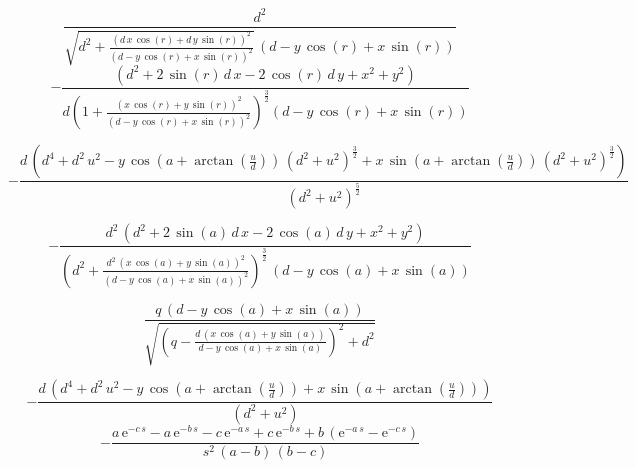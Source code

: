 \documentclass[]{article}
\begin{document}
\begin{equation}
\frac{d^2}{\sqrt{d^2 + \frac{{\left(d\, x\, \cos\!\left(r\right) + d\, y\, 
\sin\!\left(r\right)\right)}^2}{{\left(d - y\, \cos\!\left(r\right) + x\, 
\sin\!\left(r\right)\right)}^2}}\, \left(d - y\, \cos\!\left(r\right) + x\, 
\sin\!\left(r\right)\right)}
  \label{}
\end{equation}
\begin{equation}
-\frac{ \left(d^2 + 2\, \sin\!\left(r\right)\, d\, x - 2\, 
\cos\!\left(r\right)\, d\, y + x^2 + y^2\right)}
{d{\left(1 + \frac{{\left(x\, \cos\!\left(r\right) + y\, 
  \sin\!\left(r\right)\right)}^2}{{\left(d - y\, \cos\!\left(r\right) + x\, 
  \sin\!\left(r\right)\right)}^2}\right)}^{\frac{3}{2}}
\left(d - y\, \cos\!\left(r\right) + x\, \sin\!\left(r\right)\right)}
\end{equation}

\begin{equation}
  -\frac{d\, \left(d^4 + d^2\, u^2 - y\, \cos\!\left(a + \arctan\!\left(\frac{u}{d}\right)\right)\, {\left(d^2 + u^2\right)}^{\frac{3}{2}} + x\, \sin\!\left(a + \arctan\!\left(\frac{u}{d}\right)\right)\, {\left(d^2 + u^2\right)}^{\frac{3}{2}}\right)}{{\left(d^2 + u^2\right)}^{\frac{5}{2}}}
  \label{}
\end{equation}

\begin{equation}
  -\frac{d^2\, \left(d^2 + 2\, \sin\!\left(a\right)\, d\, x - 2\, \cos\!\left(a\right)\, d\, y + x^2 + y^2\right)}{{\left(d^2 + \frac{d^2\, {\left(x\, \cos\!\left(a\right) + y\, \sin\!\left(a\right)\right)}^2}{{\left(d - y\, \cos\!\left(a\right) + x\, \sin\!\left(a\right)\right)}^2}\right)}^{\frac{3}{2}}\, \left(d - y\, \cos\!\left(a\right) + x\, \sin\!\left(a\right)\right)}
  \label{}
\end{equation}

\begin{equation}
  \frac{q\, \left(d - y\, \cos\!\left(a\right) + x\, \sin\!\left(a\right)\right)}{\sqrt{{\left(q - \frac{d\, \left(x\, \cos\!\left(a\right) + y\, \sin\!\left(a\right)\right)}{d - y\, \cos\!\left(a\right) + x\, \sin\!\left(a\right)}\right)}^2 + d^2}}
  \label{}
\end{equation}

\begin{equation}
  -\frac{d\, \left(d^4 + d^2\, u^2 - y\, \cos\!\left(a +
    \arctan\!\left(\frac{u}{d}\right)\right)  + x\, \sin\!\left(a +
    \arctan\!\left(\frac{u}{d}\right)\right) \right)}{{\left(d^2 + u^2\right)}}
  \label{}
\end{equation}
\begin{equation}
  -\frac{a\, \mathrm{e}^{- c\, s} - a\, \mathrm{e}^{- b\, s} - c\, 
  \mathrm{e}^{- a\, s} + c\, \mathrm{e}^{- b\, s} + b\, \left(\mathrm{e}^{- 
  a\, s} - \mathrm{e}^{- c\, s}\right)}{s^2\, \left(a - b\right)\, \left(b - 
  c\right)}
\end{equation}
\end{document}
